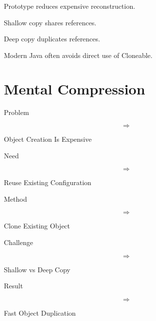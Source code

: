 \documentclass[11pt,a4paper]{book}
\begin{document}
\begin{rosettarule}

Prototype reduces expensive
reconstruction.

\end{rosettarule}


\begin{rosettarule}

Shallow copy shares references.

\end{rosettarule}


\begin{rosettarule}

Deep copy duplicates references.

\end{rosettarule}


\begin{rosettarule}

Modern Java often avoids direct
use of Cloneable.

\end{rosettarule}


\section{Mental Compression}

\begin{compressionbox}

Problem

\[
\Rightarrow
\]

Object Creation Is Expensive

\vspace{0.5em}

Need

\[
\Rightarrow
\]

Reuse Existing Configuration

\vspace{0.5em}

Method

\[
\Rightarrow
\]

Clone Existing Object

\vspace{0.5em}

Challenge

\[
\Rightarrow
\]

Shallow vs Deep Copy

\vspace{0.5em}

Result

\[
\Rightarrow
\]

Fast Object Duplication

\end{compressionbox}
\end{document}
